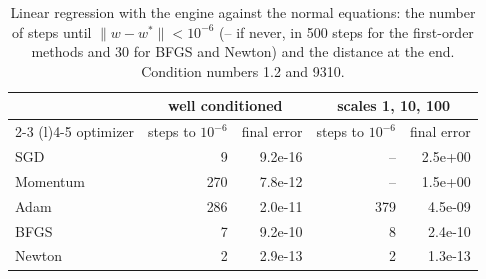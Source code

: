 \begin{table}[H]
\centering
\begin{tabular}{@{}lrrrr@{}}
\toprule
 & \multicolumn{2}{c}{well conditioned} & \multicolumn{2}{c}{scales 1, 10, 100} \\
\cmidrule(lr){2-3} \cmidrule(l){4-5}
optimizer & steps to $10^{-6}$ & final error & steps to $10^{-6}$ & final error \\
\midrule
SGD & 9 & 9.2e-16 & -- & 2.5e+00 \\
Momentum & 270 & 7.8e-12 & -- & 1.5e+00 \\
Adam & 286 & 2.0e-11 & 379 & 4.5e-09 \\
BFGS & 7 & 9.2e-10 & 8 & 2.4e-10 \\
Newton & 2 & 2.9e-13 & 2 & 1.3e-13 \\
\bottomrule
\end{tabular}
\caption{Linear regression with the engine against the normal equations: the number of steps until $\|w - w^*\| < 10^{-6}$ (-- if never, in 500 steps for the first-order methods and 30 for BFGS and Newton) and the distance at the end. Condition numbers 1.2 and 9310.}
\label{tab:linreg}
\end{table}
